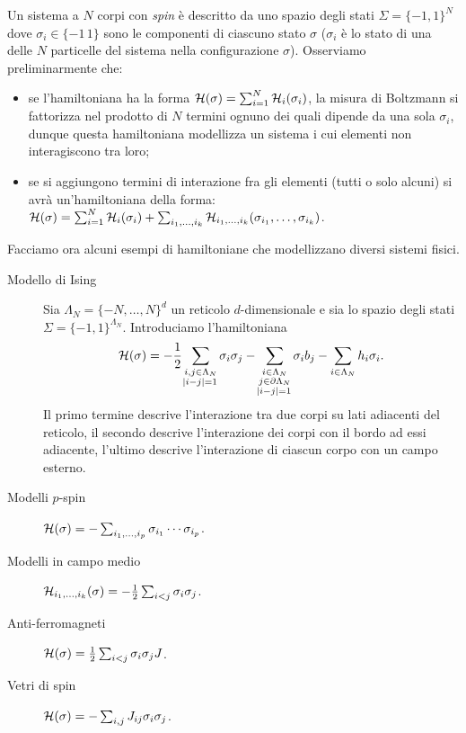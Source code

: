 Un sistema a $ N $ corpi con \emph{spin} è descritto da uno spazio degli stati $ \Sigma = \{-1,1\}^N $ dove $ \sigma_i \in \{-1\, 1\} $ sono le componenti di ciascuno stato $ \sigma $ ($ \sigma_i $ è lo stato di una delle $ N $ particelle del sistema nella configurazione $ \sigma $). Osserviamo preliminarmente che:
\begin{itemize}
    \item se l'hamiltoniana ha la forma $ \mathcal{H}(\sigma) = \sum_{i=1}^{N} \mathcal{H}_i(\sigma_i) $, la misura di Boltzmann si fattorizza nel prodotto di $ N $ termini ognuno dei quali dipende da una sola $ \sigma_i $, dunque questa hamiltoniana modellizza un sistema i cui elementi non interagiscono tra loro;
    \item se si aggiungono termini di interazione fra gli elementi (tutti o solo alcuni) si avrà un'hamiltoniana della forma:
    $ \mathcal{H}(\sigma) = \sum_{i=1}^{N} \mathcal{H}_i(\sigma_i) + \sum_{i_1, \ldots, i_k} \mathcal{H}_{i_1, \ldots, i_k} (\sigma_{i_1}, \ldots, \sigma_{i_k}) $.
\end{itemize}
Facciamo ora alcuni esempi di hamiltoniane che modellizzano diversi sistemi fisici.
\begin{description}
    \item[Modello di Ising] Sia $ \Lambda_N = \{-N, \ldots, N\}^d $ un reticolo $ d $-dimensionale e sia lo spazio degli stati $ \Sigma = \{-1,1\}^{\Lambda_N} $. Introduciamo l'hamiltoniana
    \[ \mathcal{H}(\sigma) = -\frac{1}{2}\sum_{\substack{i,j\in\Lambda_N\\ \abs{i-j}=1}} \sigma_i\sigma_j - \sum_{\substack{i\in\Lambda_N\\ j\in\partial\Lambda_N\\ \abs{i-j}=1}} \sigma_i b_j - \sum_{i\in\Lambda_N} h_i\sigma_i. \]
    Il primo termine descrive l'interazione tra due corpi su lati adiacenti del reticolo, il secondo descrive l'interazione dei corpi con il bordo ad essi adiacente, l'ultimo descrive l'interazione di ciascun corpo con un campo esterno.
    \item[Modelli $ p $-spin] $ \mathcal{H}(\sigma) = -\sum_{i_1, \ldots, i_p} \sigma_{i_1} \cdots \sigma_{i_p} $.
    \item[Modelli in campo medio] $ \mathcal{H}_{i_1, \ldots, i_k}(\sigma) = -\frac{1}{2} \sum_{i<j}\sigma_i\sigma_j $.
    \item[Anti-ferromagneti] $ \mathcal{H}(\sigma) = \frac{1}{2} \sum_{i<j} \sigma_i\sigma_j J $.
    \item[Vetri di spin] $ \mathcal{H}(\sigma) = - \sum_{i,j} J_{ij} \sigma_i\sigma_j $.
\end{description}


